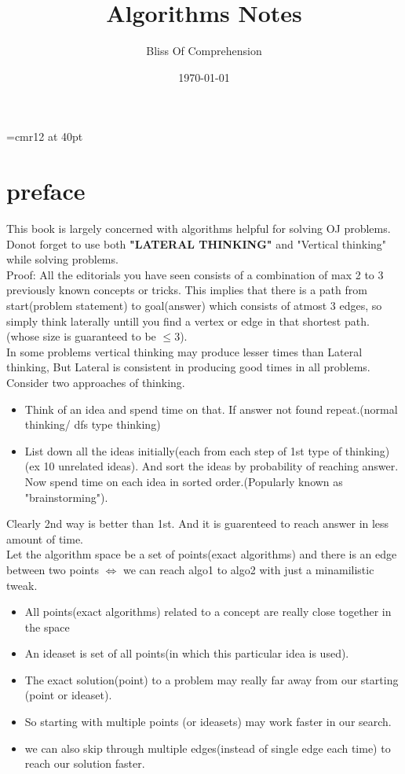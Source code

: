 \documentclass[a4paper,12pt]{report}
\begin{document}
\font\TitleF=cmr12 at 40pt
\title{\TitleF Algorithms Notes}
\author{Bliss Of Comprehension}
\date{\today}
\maketitle

\tableofcontents

\chapter*{preface}

This book is largely concerned with algorithms helpful for solving OJ problems.\\

Donot forget to use both \textbf{"LATERAL THINKING"} and "Vertical thinking" while solving problems.\\
Proof: All the editorials you have seen consists of a combination of max  2 to 3 previously known concepts or tricks. This implies that there is a path from start(problem statement) to goal(answer) which consists of atmost 3 edges, so simply think laterally untill you find a vertex or edge in that shortest path. (whose size is guaranteed to be $\leq 3$).\\ 

In some problems vertical thinking may produce lesser times than Lateral thinking, But Lateral is consistent in producing good times in all problems.\\

Consider two approaches of thinking.
\begin{itemize}
	\item Think of an idea and spend time on that. If answer not found 
	repeat.(normal thinking/ dfs type thinking)
	\item List down all the ideas initially(each from each step of 1st type of thinking) (ex 10 unrelated ideas). And sort the ideas by probability of reaching answer. Now spend time on each idea in sorted order.(Popularly known as "brainstorming").
\end{itemize}
Clearly 2nd way is better than 1st. And it is guarenteed to reach answer in less amount of time.\\

Let the algorithm space be a set of points(exact algorithms) and there is an edge between two points $\iff$ we can reach algo1 to algo2 with just a minamilistic tweak. 

\begin{itemize}
	\item All points(exact algorithms) related to a concept are really close together in the space
	\item An ideaset is set of all points(in which this particular idea is used).
	\item The exact solution(point) to a problem may really far away from our starting (point or ideaset).
	\item So starting with multiple points (or ideasets) may work faster in our search.
	\item we can also skip through multiple edges(instead of single edge each time) to reach our solution faster.
\end{itemize} 
\end{document}
